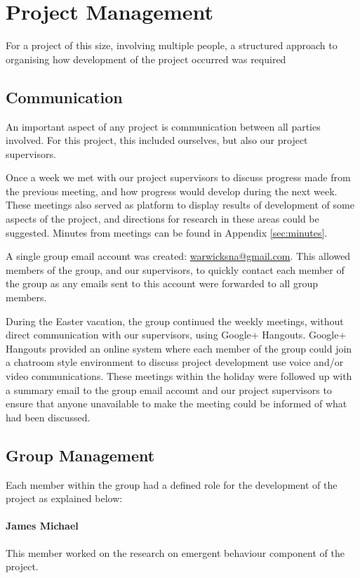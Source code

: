 \section{Project Management}
For a project of this size, involving multiple people, a structured approach to organising how development of the project occurred was required

\subsection{Communication}
An important aspect of any project is communication between all parties involved. For this project, this included ourselves, but also our project supervisors.

Once a week we met with our project supervisors to discuss progress made from the previous meeting, and how progress would develop during the next week. These meetings also served as platform to display results of development of some aspects of the project, and directions for research in these areas could be suggested. Minutes from meetings can be found in Appendix \ref{sec:minutes}.

A single group email account was created: \href{mailto:warwicksna@gmail.com}{warwicksna@gmail.com}. This allowed members of the group, and our supervisors, to quickly contact each member of the group as any emails sent to this account were forwarded to all group members.

During the Easter vacation, the group continued the weekly meetings, without direct communication with our supervisors, using Google+ Hangouts. Google+ Hangouts provided an online system where each member of the group could join a chatroom style environment to discuss project development use voice and/or video communications. These meetings within the holiday were followed up with a summary email to the group email account and our project supervisors to ensure that anyone unavailable to make the meeting could be informed of what had been discussed.

\subsection{Group Management}
Each member within the group had a defined role for the development of the project as explained below:

\paragraph{James Michael}
This member worked on the research on emergent behaviour component of the project.

